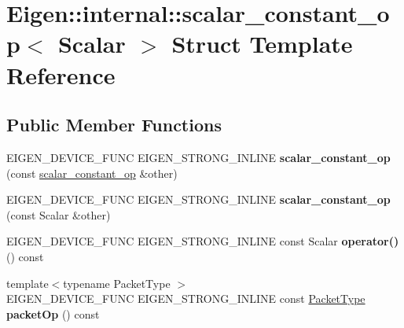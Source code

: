 \hypertarget{struct_eigen_1_1internal_1_1scalar__constant__op}{}\section{Eigen\+:\+:internal\+:\+:scalar\+\_\+constant\+\_\+op$<$ Scalar $>$ Struct Template Reference}
\label{struct_eigen_1_1internal_1_1scalar__constant__op}
\subsection*{Public Member Functions}
\begin{DoxyCompactItemize}
\item 
\mbox{\label{struct_eigen_1_1internal_1_1scalar__constant__op_ab33f359bbcbe7a375f3e71ad62919cde}} 
E\+I\+G\+E\+N\+\_\+\+D\+E\+V\+I\+C\+E\+\_\+\+F\+U\+NC E\+I\+G\+E\+N\+\_\+\+S\+T\+R\+O\+N\+G\+\_\+\+I\+N\+L\+I\+NE {\bfseries scalar\+\_\+constant\+\_\+op} (const \hyperlink{struct_eigen_1_1internal_1_1scalar__constant__op}{scalar\+\_\+constant\+\_\+op} \&other)
\item 
\mbox{\label{struct_eigen_1_1internal_1_1scalar__constant__op_a40bf197abeae43e3478bdf1ca048a20d}} 
E\+I\+G\+E\+N\+\_\+\+D\+E\+V\+I\+C\+E\+\_\+\+F\+U\+NC E\+I\+G\+E\+N\+\_\+\+S\+T\+R\+O\+N\+G\+\_\+\+I\+N\+L\+I\+NE {\bfseries scalar\+\_\+constant\+\_\+op} (const Scalar \&other)
\item 
\mbox{\label{struct_eigen_1_1internal_1_1scalar__constant__op_a16de349a3938f7c7db6aac63c9619d41}} 
E\+I\+G\+E\+N\+\_\+\+D\+E\+V\+I\+C\+E\+\_\+\+F\+U\+NC E\+I\+G\+E\+N\+\_\+\+S\+T\+R\+O\+N\+G\+\_\+\+I\+N\+L\+I\+NE const Scalar {\bfseries operator()} () const
\item 
\mbox{\label{struct_eigen_1_1internal_1_1scalar__constant__op_a27e7079c0d1c983f98f2507d72d4c385}} 
{\footnotesize template$<$typename Packet\+Type $>$ }\\E\+I\+G\+E\+N\+\_\+\+D\+E\+V\+I\+C\+E\+\_\+\+F\+U\+NC E\+I\+G\+E\+N\+\_\+\+S\+T\+R\+O\+N\+G\+\_\+\+I\+N\+L\+I\+NE const \hyperlink{struct_eigen_1_1_packet_type}{Packet\+Type} {\bfseries packet\+Op} () const

\end{DoxyCompactItemize}
